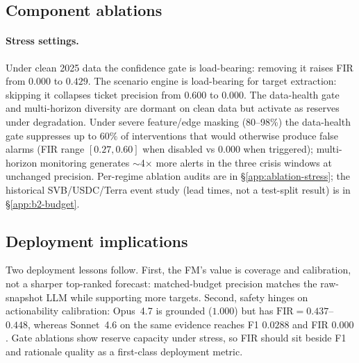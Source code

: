 \subsection{Component ablations}
\paragraph{Stress settings.}
Under clean 2025 data the confidence gate is load-bearing: removing
it raises FIR from $0.000$ to $0.429$. The scenario engine is
load-bearing for target extraction: skipping it collapses ticket
precision from $0.600$ to $0.000$. The data-health gate and
multi-horizon diversity are dormant on clean data but activate as
reserves under degradation. Under severe feature/edge masking
(80--98\%) the data-health gate suppresses up to $60\%$ of
interventions that would otherwise produce false alarms (FIR range
$[0.27,0.60]$ when disabled vs $0.000$ when triggered);
multi-horizon monitoring generates $\sim$4$\times$ more alerts in
the three crisis windows at unchanged precision.
Per-regime ablation audits are in \S\ref{app:ablation-stress}; the
historical SVB/USDC/Terra event study (lead times, not a test-split
result) is in \S\ref{app:b2-budget}.

\subsection{Deployment implications}
Two deployment lessons follow. First, the FM's value is coverage and
calibration, not a sharper top-ranked forecast: matched-budget
precision matches the raw-snapshot LLM while supporting more targets.
Second, safety hinges on actionability calibration: Opus~4.7 is
grounded ($1.000$) but has $\mathrm{FIR}\!=\!0.437$--$0.448$,
whereas Sonnet~4.6 on the same evidence reaches F1 $0.0288$ and
FIR $0.000$. Gate ablations show reserve capacity under stress, so
FIR should sit beside F1 and rationale quality as a first-class
deployment metric.
